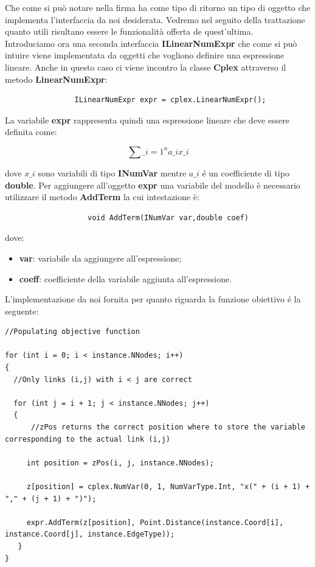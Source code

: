 \documentclass[11pt]{article}
\begin{document}
Che come si può notare nella firma ha come tipo di ritorno un tipo di oggetto che implementa l'interfaccia da noi desiderata. Vedremo nel seguito della trattazione quanto utili risultano essere le funzionalità offerta de quest'ultima.\\
Introduciamo ora una seconda interfaccia \textbf{ILinearNumExpr} che come si può intuire viene implementata da oggetti che vogliono definire una espressione lineare. Anche in questo caso ci viene incontro la classe \textbf{Cplex} attraverso il metodo \textbf{LinearNumExpr}:
\begin{lstlisting}
                ILinearNumExpr expr = cplex.LinearNumExpr();
\end{lstlisting}

La variabile \textbf{expr} rappresenta quindi una espressione lineare che deve essere definita come:

$$\displaystyle{\sum\_{i = 1}^n a\_i x\_i} $$

dove \textbf{$x\_i$} sono variabili di tipo \textbf{INumVar} mentre \textbf{$a\_i$} \'e un coefficiente di tipo \textbf{double}. Per aggiungere all'oggetto \textbf{expr} una variabile del modello \`e necessario utilizzare il metodo \textbf{AddTerm} la cui intestazione \`e:

\begin{lstlisting}
                   void AddTerm(INumVar var,double coef)
\end{lstlisting}

dove:

\begin{itemize}
\item \textbf{var}: variabile da aggiungere all'espressione;
\item  \textbf{coeff}: coefficiente della variabile aggiunta all'espressione.
\end{itemize}

L'implementazione da noi fornita per quanto riguarda la funzione obiettivo \'e la seguente:

\begin{lstlisting}
//Populating objective function

for (int i = 0; i < instance.NNodes; i++)
{
  //Only links (i,j) with i < j are correct
  
  for (int j = i + 1; j < instance.NNodes; j++)
  {
      //zPos returns the correct position where to store the variable corresponding to the actual link (i,j)
           
     int position = zPos(i, j, instance.NNodes);
           
     z[position] = cplex.NumVar(0, 1, NumVarType.Int, "x(" + (i + 1) + "," + (j + 1) + ")");
         
     expr.AddTerm(z[position], Point.Distance(instance.Coord[i], instance.Coord[j], instance.EdgeType));      
   }
}

\end{lstlisting}
\end{document}
